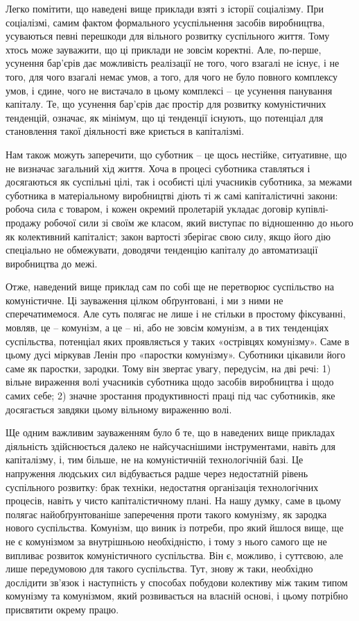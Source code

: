 \documentclass[12pt,a4paper,openany]{book}
\begin{document}
Легко помітити, що наведені вище приклади взяті з історії соціалізму. При соціалізмі, самим фактом формального усуспільнення засобів виробництва, усуваються певні перешкоди для вільного розвитку суспільного життя. Тому хтось може зауважити, що ці приклади не зовсім коректні. Але, по-перше, усунення бар’єрів дає можливість реалізації не того, чого взагалі не існує, і не того, для чого взагалі немає умов, а того, для чого не було повного комплексу умов, і єдине, чого не вистачало в цьому комплексі – це усунення панування капіталу. Те, що усунення бар’єрів дає простір для розвитку комуністичних тенденцій, означає, як мінімум, що ці тенденції існують, що потенціал для становлення такої діяльності вже криється в капіталізмі.

Нам також можуть заперечити, що суботник – це щось нестійке, ситуативне, що не визначає загальний хід життя. Хоча в процесі суботника ставляться і досягаються як суспільні цілі, так і особисті цілі учасників суботника, за межами суботника в матеріальному виробництві діють ті ж самі капіталістичні закони: робоча сила є товаром, і кожен окремий пролетарій укладає договір купівлі-продажу робочої сили зі своїм же класом, який виступає по відношенню до нього як колективний капіталіст; закон вартості зберігає свою силу, якщо його дію спеціально не обмежувати, доводячи тенденцію капіталу до автоматизації виробництва до межі.

Отже, наведений вище приклад сам по собі ще не перетворює суспільство на комуністичне. Ці зауваження цілком обґрунтовані, і ми з ними не сперечатимемося. Але суть полягає не лише і не стільки в простому фіксуванні, мовляв, це – комунізм, а це – ні, або не зовсім комунізм, а в тих тенденціях суспільства, потенціал яких проявляється у таких «острівцях комунізму». Саме в цьому дусі міркував Ленін про «паростки комунізму». Суботники цікавили його саме як паростки, зародки. Тому він звертає увагу, передусім, на дві речі: 1) вільне вираження волі учасників суботника щодо засобів виробництва і щодо самих себе; 2) значне зростання продуктивності праці під час суботників, яке досягається завдяки цьому вільному вираженню волі.

Ще одним важливим зауваженням було б те, що в наведених вище прикладах діяльність здійснюється далеко не найсучаснішими інструментами, навіть для капіталізму, і, тим більше, не на комуністичній технологічній базі. Це напруження людських сил відбувається радше через недостатній рівень суспільного розвитку: брак техніки, недостатня організація технологічних процесів, навіть у чисто капіталістичному плані. На нашу думку, саме в цьому полягає найобґрунтованіше заперечення проти такого комунізму, як зародка нового суспільства. Комунізм, що виник із потреби, про який йшлося вище, ще не є комунізмом за внутрішньою необхідністю, і тому з нього самого ще не випливає розвиток комуністичного суспільства. Він є, можливо, і суттєвою, але лише передумовою для такого суспільства. Тут, знову ж таки, необхідно дослідити зв’язок і наступність у способах побудови колективу між таким типом комунізму та комунізмом, який розвивається на власній основі, і цьому потрібно присвятити окрему працю.
\end{document}
